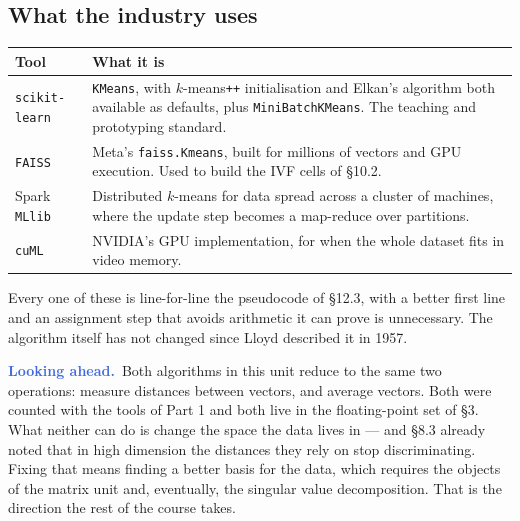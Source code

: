 \documentclass[11pt]{article}
\theoremstyle{plain}
\theoremstyle{definition}
\theoremstyle{remark}
\newcommand{\lookahead}{\par\smallskip\noindent
  \textbf{\sffamily\textcolor{RoyalBlue}{Looking ahead.}}\ \ignorespaces}
\begin{document}
\subsection{What the industry uses}
\begin{center}
\renewcommand{\arraystretch}{1.35}
\begin{tabular}{@{}l >{\raggedright\arraybackslash}p{9.0cm}@{}}
\toprule
\textbf{Tool} & \textbf{What it is} \\
\midrule
\texttt{scikit-learn}
  & \texttt{KMeans}, with $k$-means\texttt{++} initialisation and Elkan's
    algorithm both available as defaults, plus \texttt{MiniBatchKMeans}. The
    teaching and prototyping standard. \\
\texttt{FAISS}
  & Meta's \texttt{faiss.Kmeans}, built for millions of vectors and GPU
    execution. Used to build the IVF cells of \S10.2. \\
Spark \texttt{MLlib}
  & Distributed $k$-means for data spread across a cluster of machines, where
    the update step becomes a map-reduce over partitions. \\
\texttt{cuML}
  & NVIDIA's GPU implementation, for when the whole dataset fits in
    video memory. \\
\bottomrule
\end{tabular}
\end{center}

\noindent Every one of these is line-for-line the pseudocode of \S12.3, with a
better first line and an assignment step that avoids arithmetic it can prove is
unnecessary. The algorithm itself has not changed since Lloyd described it in
1957.

\lookahead Both algorithms in this unit reduce to the same two operations:
measure distances between vectors, and average vectors. Both were counted with
the tools of Part 1 and both live in the floating-point set of \S3. What neither
can do is change the space the data lives in --- and \S8.3 already noted that in
high dimension the distances they rely on stop discriminating. Fixing that means
finding a better basis for the data, which requires the objects of the matrix
unit and, eventually, the singular value decomposition. That is the direction
the rest of the course takes.
\end{document}
